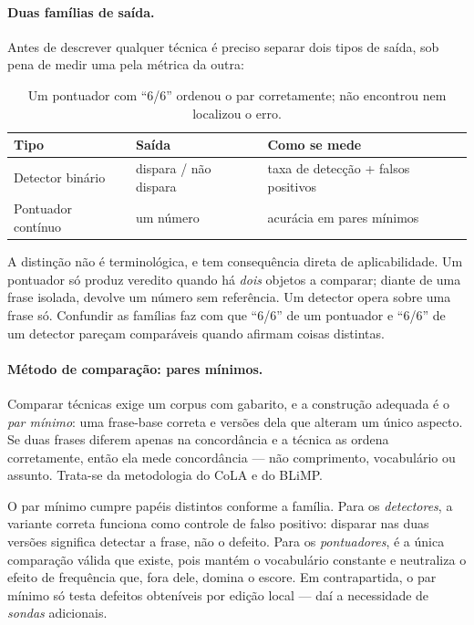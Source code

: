 \documentclass[11pt,a4paper]{article}
\newcommand{\dimtable}[1]{\small #1}
\begin{document}
\paragraph{Duas famílias de saída.}
Antes de descrever qualquer técnica é preciso separar dois tipos de saída, sob pena de medir uma
pela métrica da outra:

\begin{table}[H]
\centering
\dimtable{
\begin{tabular}{@{}lll@{}}
\toprule
\textbf{Tipo} & \textbf{Saída} & \textbf{Como se mede} \\
\midrule
Detector binário   & dispara / não dispara & taxa de detecção + falsos positivos \\
Pontuador contínuo & um número             & acurácia em pares mínimos \\
\bottomrule
\end{tabular}}
\caption{Um pontuador com ``6/6'' ordenou o par corretamente; não encontrou nem localizou o erro.}
\label{tab:familias}
\end{table}

\noindent A distinção não é terminológica, e tem consequência direta de aplicabilidade. Um pontuador
só produz veredito quando há \emph{dois} objetos a comparar; diante de uma frase isolada, devolve um
número sem referência. Um detector opera sobre uma frase só. Confundir as famílias faz com que
``6/6'' de um pontuador e ``6/6'' de um detector pareçam comparáveis quando afirmam coisas
distintas.

\paragraph{Método de comparação: pares mínimos.}
Comparar técnicas exige um corpus com gabarito, e a construção adequada é o \emph{par mínimo}: uma
frase-base correta e versões dela que alteram um único aspecto. Se duas frases diferem apenas na
concordância e a técnica as ordena corretamente, então ela mede concordância --- não comprimento,
vocabulário ou assunto. Trata-se da metodologia do CoLA e do BLiMP.

O par mínimo cumpre papéis distintos conforme a família. Para os \emph{detectores}, a variante
correta funciona como controle de falso positivo: disparar nas duas versões significa detectar a
frase, não o defeito. Para os \emph{pontuadores}, é a única comparação válida que existe, pois
mantém o vocabulário constante e neutraliza o efeito de frequência que, fora dele, domina o escore.
Em contrapartida, o par mínimo só testa defeitos obteníveis por edição local --- daí a necessidade
de \emph{sondas} adicionais.
\end{document}
